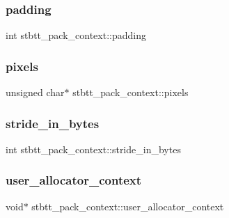 \subsubsection{\texorpdfstring{padding}{padding}}
{\footnotesize\ttfamily int stbtt\+\_\+pack\+\_\+context\+::padding}

\hypertarget{structstbtt__pack__context_a6549105fd1922df983fbe036b9db4a1a}{}\label{structstbtt__pack__context_a6549105fd1922df983fbe036b9db4a1a} 
\subsubsection{\texorpdfstring{pixels}{pixels}}
{\footnotesize\ttfamily unsigned char$\ast$ stbtt\+\_\+pack\+\_\+context\+::pixels}

\hypertarget{structstbtt__pack__context_abbe9a25aae0e26b81a5f7339fac23801}{}\label{structstbtt__pack__context_abbe9a25aae0e26b81a5f7339fac23801} 
\subsubsection{\texorpdfstring{stride\+\_\+in\+\_\+bytes}{stride\_in\_bytes}}
{\footnotesize\ttfamily int stbtt\+\_\+pack\+\_\+context\+::stride\+\_\+in\+\_\+bytes}

\hypertarget{structstbtt__pack__context_a45fddc4d4adfcef58aa08ad2874cedc0}{}\label{structstbtt__pack__context_a45fddc4d4adfcef58aa08ad2874cedc0} 
\subsubsection{\texorpdfstring{user\+\_\+allocator\+\_\+context}{user\_allocator\_context}}
{\footnotesize\ttfamily void$\ast$ stbtt\+\_\+pack\+\_\+context\+::user\+\_\+allocator\+\_\+context}

\hypertarget{structstbtt__pack__context_a4b55efa27ef36e7f258afe92921784c0}{}\label{structstbtt__pack__context_a4b55efa27ef36e7f258afe92921784c0} 
